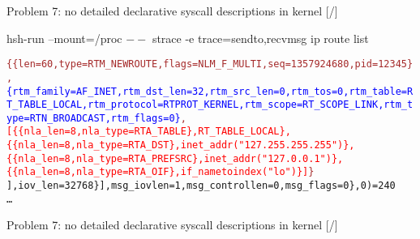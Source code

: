 \documentclass[unicode,aspectratio=169]{beamer}
\begin{document}
\begin{frame}{Problem 7: no detailed declarative syscall descriptions in kernel \hfill [\insertframenumber/\inserttotalframenumber]}
\begin{block}{hsh-run --mount=/proc $--$ strace -e trace=sendto,recvmsg ip route list}
\begin{alltt}
\textcolor{brown}{\{\{len=60, type=RTM\_NEWROUTE, flags=NLM\_F\_MULTI, seq=1357924680, pid=12345\},
 \textcolor{blue}{\{rtm\_family=AF\_INET, rtm\_dst\_len=32, rtm\_src\_len=0, rtm\_tos=0, rtm\_table=RT\_TABLE\_LOCAL, rtm\_protocol=RTPROT\_KERNEL, rtm\_scope=RT\_SCOPE\_LINK, rtm\_type=RTN\_BROADCAST, rtm\_flags=0\}},
  \textcolor{red}{[\{\{nla\_len=8, nla\_type=RTA\_TABLE\}, RT\_TABLE\_LOCAL\}, \{\{nla\_len=8, nla\_type=RTA\_DST\}, inet\_addr("127.255.255.255")\}, \{\{nla\_len=8, nla\_type=RTA\_PREFSRC\}, inet\_addr("127.0.0.1")\}, \{\{nla\_len=8, nla\_type=RTA\_OIF\}, if\_nametoindex("lo")\}]}\}}
], iov\_len=32768\}], msg\_iovlen=1, msg\_controllen=0, msg\_flags=0\}, 0) = 240 \\
\ldots
\end{alltt}
\end{block}
\end{frame}

\begin{frame}[fragile]{Problem 7: no detailed declarative syscall descriptions in kernel \hfill [\insertframenumber/\inserttotalframenumber]}
\end{frame}
\end{document}
